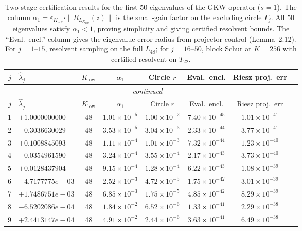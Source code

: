 \documentclass[11pt]{article}
\begin{document}
\begin{longtable}{rlcccccc}
\caption{Two-stage certification results for the first $50$ eigenvalues of the GKW operator ($s=1$).
The column $\alpha_1 = \varepsilon_{K_{\mathrm{low}}} \cdot \|R_{L_{K_{\mathrm{low}}}}(z)\|$ is the
small-gain factor on the excluding circle $\Gamma_j$.  All $50$ eigenvalues satisfy $\alpha_1 < 1$,
proving simplicity and giving certified resolvent bounds.
The ``Eval.~encl.'' column gives the eigenvalue error radius from
projector control (Lemma~2.12).
For $j = 1$--$15$, resolvent sampling on the full $L_{48}$;
for $j = 16$--$50$, block Schur at $K = 256$ with certified resolvent on $T_{22}$.}
\label{S-tab:two-stage-results}\\
\toprule
$j$ & $\hat\lambda_j$ & $K_{\mathrm{low}}$ & $\alpha_1$ & Circle $r$ & Eval.~encl. & Riesz proj.~err \\
\midrule
\endfirsthead
\multicolumn{7}{c}{\textit{continued}} \\
\toprule
$j$ & $\hat\lambda_j$ & $K_{\mathrm{low}}$ & $\alpha_1$ & Circle $r$ & Eval.~encl. & Riesz proj.~err \\
\midrule
\endhead
1 & $+1.0000000000$ & 48 & $1.01 \times 10^{-5}$ & $1.00 \times 10^{-2}$ & $7.40 \times 10^{-45}$ & $1.01 \times 10^{-41}$ \\
2 & $-0.3036630029$ & 48 & $3.53 \times 10^{-5}$ & $3.04 \times 10^{-3}$ & $2.33 \times 10^{-44}$ & $3.77 \times 10^{-41}$ \\
3 & $+0.1008845093$ & 48 & $1.11 \times 10^{-4}$ & $1.01 \times 10^{-3}$ & $7.32 \times 10^{-44}$ & $1.23 \times 10^{-40}$ \\
4 & $-0.0354961590$ & 48 & $3.24 \times 10^{-4}$ & $3.55 \times 10^{-4}$ & $2.17 \times 10^{-43}$ & $3.73 \times 10^{-40}$ \\
5 & $+0.0128437904$ & 48 & $9.15 \times 10^{-4}$ & $1.28 \times 10^{-4}$ & $6.22 \times 10^{-43}$ & $1.08 \times 10^{-39}$ \\
6 & $-4.7177775e-03$ & 48 & $2.52 \times 10^{-3}$ & $4.72 \times 10^{-5}$ & $1.75 \times 10^{-42}$ & $3.01 \times 10^{-39}$ \\
7 & $+1.7486751e-03$ & 48 & $6.85 \times 10^{-3}$ & $1.75 \times 10^{-5}$ & $4.85 \times 10^{-42}$ & $8.29 \times 10^{-39}$ \\
8 & $-6.5202086e-04$ & 48 & $1.84 \times 10^{-2}$ & $6.52 \times 10^{-6}$ & $1.33 \times 10^{-41}$ & $2.29 \times 10^{-38}$ \\
9 & $+2.4413147e-04$ & 48 & $4.91 \times 10^{-2}$ & $2.44 \times 10^{-6}$ & $3.63 \times 10^{-41}$ & $6.49 \times 10^{-38}$ \\

\end{longtable}
\end{document}
